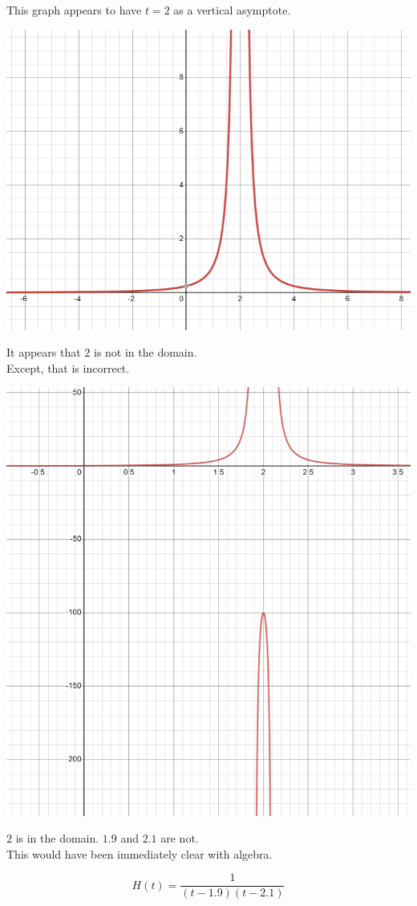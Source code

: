 \documentclass{ximera}
\begin{document}
\begin{example}


This graph appears to have $t=2$ as a vertical asymptote.

\begin{image}
\includegraphics{pics/graph_2A.png}
\end{image}

It appears that $2$ is not in the domain. \\


Except, that is incorrect.

\begin{image}
\includegraphics{pics/graph_2B.png}
\end{image}


$2$ is in the domain. $1.9$ and $2.1$ are not. \\


This would have been immediately clear with algebra.

\[  H(t) = \frac{1}{(t-1.9)(t-2.1)}     \]


\end{example}
\end{document}
